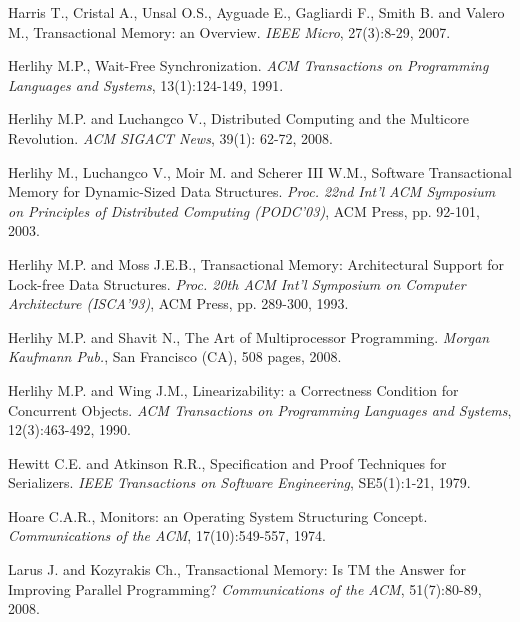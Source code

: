 \begin{thebibliography}{99}
{%
Harris T., Cristal  A., Unsal O.S., Ayguade E., Gagliardi  F., Smith B. and
Valero M., 
Transactional Memory: an Overview. 
{\it IEEE Micro}, 27(3):8-29, 2007. 

Herlihy M.P., 
Wait-Free Synchronization. 
{\it ACM Transactions on Programming Languages and Systems}, 
13(1):124-149, 1991. 


Herlihy M.P.  and Luchangco V.,
Distributed Computing and the Multicore Revolution.
{\it ACM SIGACT News}, 39(1): 62-72, 2008.


Herlihy M.,  Luchangco V.,  Moir M. and  Scherer III W.M., 
 Software Transactional Memory for Dynamic-Sized Data Structures. 
{\it  Proc. 22nd  Int'l  ACM Symposium on Principles of  Distributed 
Computing (PODC'03)},  ACM Press, pp. 92-101,  2003. 



Herlihy M.P.  and Moss J.E.B., 
Transactional Memory: Architectural Support for Lock-free Data Structures. 
{\it Proc. 20th ACM Int'l Symposium  on Computer Architecture  (ISCA'93)}, 
ACM Press, pp. 289-300, 1993. 


Herlihy M.P.  and Shavit N.,
The Art of Multiprocessor Programming. 
{\it Morgan Kaufmann Pub.}, San Francisco (CA), 508 pages, 2008. 


Herlihy M.P.  and Wing J.M.,
Linearizability: a Correctness Condition for Concurrent Objects. 
{\it ACM Transactions on Programming Languages and Systems}, 
12(3):463-492, 1990. 


Hewitt C.E. and Atkinson R.R., 
Specification and Proof Techniques for Serializers. 
{\it IEEE Transactions on Software Engineering}, SE5(1):1-21, 1979. 



Hoare C.A.R., 
Monitors: an Operating System Structuring Concept. 
{\it Communications of the  ACM}, 17(10):549-557, 1974. 


Larus J. and Kozyrakis Ch., 
Transactional Memory: Is TM the Answer for Improving Parallel Programming?
{\it Communications of the ACM}, 51(7):80-89, 2008. 


}
\end{thebibliography}
